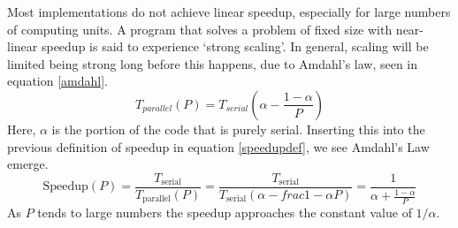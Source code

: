 \documentclass[../main.tex]{subfiles}
\begin{document}
    Most implementations do not achieve linear speedup, especially for large numbers of computing units.
    A program that solves a problem of fixed size with near-linear speedup is said to experience `strong scaling'.
    In general, scaling will be limited being strong long before this happens, due to Amdahl's law, seen in equation \ref{amdahl}.
    \begin{equation}
      T_{parallel}(P) = T_{serial}\left(\alpha-\frac{1-\alpha}{P}\right)
    \end{equation}
    Here, $\alpha$ is the portion of the code that is purely serial.
    Inserting this into the previous definition of speedup in equation \ref{speedupdef}, we see Amdahl's Law emerge.
    \begin{equation}
      \text{Speedup}(P) = \frac{T_\text{serial}}{T_\text{parallel}(P)} = \frac{T_\text{serial}}{T_\text{serial}\left(\alpha-frac{1-\alpha}{P}\right)} = \frac{1}{\alpha+\frac{1-\alpha}{P}}
      \label{amdahl}
    \end{equation}
    As $P$ tends to large numbers the speedup approaches the constant value of $1/\alpha$.  
    
\end{document}
